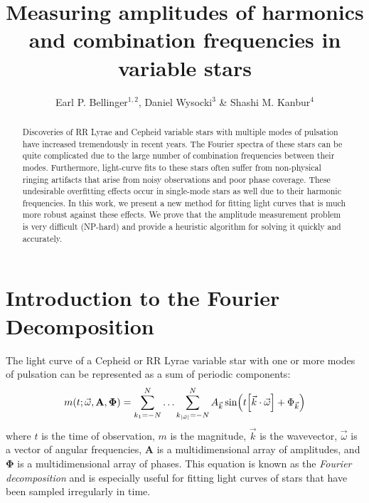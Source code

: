 \documentclass[11pt,twoside]{book}
\begin{document}
\pagestyle{myheadings}
\setcounter{equation}{0}\setcounter{figure}{0}\setcounter{footnote}{0}\setcounter{section}{0}\setcounter{table}{0}\setcounter{page}{1}
\title{Measuring amplitudes of harmonics and combination frequencies in variable stars}
\author{Earl P. Bellinger$^{1,2}$, Daniel Wysocki$^3$ \& Shashi M. Kanbur$^4$}

\begin{abstract}
Discoveries of RR Lyrae and Cepheid variable stars with multiple modes of pulsation have increased tremendously in recent years. The Fourier spectra of these stars can be quite complicated due to the large number of combination frequencies between their modes. Furthermore, light-curve fits to these stars often suffer from non-physical ringing artifacts that arise from noisy observations and poor phase coverage. These undesirable overfitting effects occur in single-mode stars as well due to their harmonic frequencies. In this work, we present a new method for fitting light curves that is much more robust against these effects. We prove that the amplitude measurement problem is very difficult (NP-hard) and provide a heuristic algorithm for solving it quickly and accurately. 
\end{abstract}

\section{Introduction to the Fourier Decomposition}
The light curve of a Cepheid or RR Lyrae variable star with one or more modes of pulsation can be represented as a sum of periodic components:
\begin{equation}
    m(t ; \vec \omega, \mathbf A, \boldsymbol \Phi) = \sum_{k_1={-N}}^N \ldots \sum_{k_{|\vec \omega|}={-N}}^N A_{\vec k} \sin(t\qty[\vec k\cdot \vec \omega] + \Phi_{\vec k})
\end{equation}
where $t$ is the time of observation, $m$ is the magnitude, $\vec k$ is the wavevector, $\vec \omega$ is a vector of angular frequencies, $\mathbf A$ is a multidimensional array of amplitudes, and $\boldsymbol \Phi$ is a multidimensional array of phases. This equation is known as the \emph{Fourier decomposition} and is especially useful for fitting light curves of stars that have been sampled irregularly in time.
\end{document}

